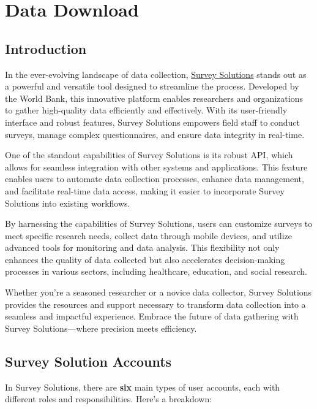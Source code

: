 \documentclass[
  letterpaper,
  DIV=11,
  numbers=noendperiod]{scrreprt}
\begin{document}

\chapter{Data Download}\label{data-download}

\section{Introduction}\label{introduction-1}

In the ever-evolving landscape of data collection,
\href{https://mysurvey.solutions/en/}{Survey Solutions} stands out as a
powerful and versatile tool designed to streamline the process.
Developed by the World Bank, this innovative platform enables
researchers and organizations to gather high-quality data efficiently
and effectively. With its user-friendly interface and robust features,
Survey Solutions empowers field staff to conduct surveys, manage complex
questionnaires, and ensure data integrity in real-time.

One of the standout capabilities of Survey Solutions is its robust API,
which allows for seamless integration with other systems and
applications. This feature enables users to automate data collection
processes, enhance data management, and facilitate real-time data
access, making it easier to incorporate Survey Solutions into existing
workflows.

By harnessing the capabilities of Survey Solutions, users can customize
surveys to meet specific research needs, collect data through mobile
devices, and utilize advanced tools for monitoring and data analysis.
This flexibility not only enhances the quality of data collected but
also accelerates decision-making processes in various sectors, including
healthcare, education, and social research.

Whether you're a seasoned researcher or a novice data collector, Survey
Solutions provides the resources and support necessary to transform data
collection into a seamless and impactful experience. Embrace the future
of data gathering with Survey Solutions---where precision meets
efficiency.

\section{Survey Solution Accounts}\label{survey-solution-accounts}

In Survey Solutions, there are \textbf{six} main types of user accounts,
each with different roles and responsibilities. Here's a breakdown:
\end{document}
